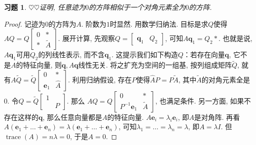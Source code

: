 \documentclass{ctexart}
\newtheorem{exercise}[thm]{习题}
\newcommand\bs[1]{\boldsymbol{ #1}}
\newcommand\hint[1]{\par {\footnotesize\kaishu 提示：#1}}
\def\hard{$\heartsuit$}
\def\wtd{\widetilde}
\def\what{\widehat}
\DeclareMathOperator{\trace}{trace}
\begin{document}
\begin{exercise}
\hard\hard 证明, 任意迹为$0$的方阵相似于一个对角元素全为$0$的方阵. 

\end{exercise}
\begin{proof}
	记迹为$0$的方阵为$A$. 
	阶数为$1$时显然. 用数学归纳法. 目标是求$Q$使得$AQ=Q\begin{bmatrix}
		0 & *\\ * & \wtd A
	\end{bmatrix}$. 
	展开计算, 先观察$Q=\begin{bmatrix}
		\bs q_1 & Q_2
	\end{bmatrix}$, 可知$A\bs q_1=Q_2*$. 也就是说, $A\bs q_1$可用$Q_2$的列线性表示, 而不含$\bs q_1$. 
	这提示我们如下构造$Q$：若存在向量$\bs q$, 它不是$A$的特征向量, 则$\bs q,A\bs q$线性无关. 将之扩充为空间的一组基, 按列组成矩阵$\wtd Q$, 就有$A\wtd Q=\wtd Q\begin{bmatrix}
		0 &*\\ \bs e_1 & \what A
	\end{bmatrix}$. 
	利用归纳假设, 存在$P$使得$\what AP=P\wtd A$, 其中$\wtd A$的对角元素全是$0$. 令$Q = \wtd Q \begin{bmatrix}
		1 & \\ & P
	\end{bmatrix}.$ 那么
	$AQ = Q \begin{bmatrix}
	0 & *\\ P^{-1}\bs e_1 &\wtd A
	\end{bmatrix}$, 也满足条件. 
	另一方面, 如果不存在这样的$\bs q$, 那么任意向量都是$A$的特征向量. 
	$A\bs e_i=\lambda_i\bs e_i$, 即$A$是对角阵. 
	再看$A(\bs e_1+\dots+\bs e_n)=\lambda(\bs e_1+\dots+\bs e_n)$, 可知$\lambda_1=\dots=\lambda_n=\lambda$, 即$A=\lambda I$. 
	但$\trace(A)=n\lambda=0$, 于是$A=0$. 
\end{proof}
\end{document}
